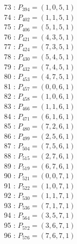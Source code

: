 \documentclass{article}
\begin{document}
{\begin{multicols}{3}
73 : $P_{394}=( 1, 0, 5, 1 )$\\
74 : $P_{402}=( 1, 1, 5, 1 )$\\
75 : $P_{406}=( 5, 1, 5, 1 )$\\
76 : $P_{421}=( 4, 3, 5, 1 )$\\
77 : $P_{424}=( 7, 3, 5, 1 )$\\
78 : $P_{430}=( 5, 4, 5, 1 )$\\
79 : $P_{432}=( 7, 4, 5, 1 )$\\
80 : $P_{453}=( 4, 7, 5, 1 )$\\
81 : $P_{457}=( 0, 0, 6, 1 )$\\
82 : $P_{458}=( 1, 0, 6, 1 )$\\
83 : $P_{466}=( 1, 1, 6, 1 )$\\
84 : $P_{471}=( 6, 1, 6, 1 )$\\
85 : $P_{480}=( 7, 2, 6, 1 )$\\
86 : $P_{499}=( 2, 5, 6, 1 )$\\
87 : $P_{504}=( 7, 5, 6, 1 )$\\
88 : $P_{515}=( 2, 7, 6, 1 )$\\
89 : $P_{519}=( 6, 7, 6, 1 )$\\
90 : $P_{521}=( 0, 0, 7, 1 )$\\
91 : $P_{522}=( 1, 0, 7, 1 )$\\
92 : $P_{530}=( 1, 1, 7, 1 )$\\
93 : $P_{536}=( 7, 1, 7, 1 )$\\
94 : $P_{564}=( 3, 5, 7, 1 )$\\
95 : $P_{572}=( 3, 6, 7, 1 )$\\
96 : $P_{576}=( 7, 6, 7, 1 )$\\
\end{multicols}


%


%


}%
\end{document}
